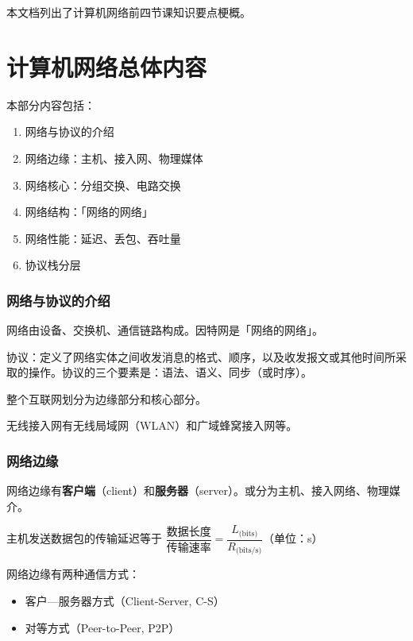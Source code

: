 \documentclass[UTF8]{ctexart}
\newcommand\Emph[1]{\colorbox{green!10}{\textcolor{green!30!black}{#1}}}
\begin{document}
{\color{cyan!50!black}
本文档列出了计算机网络前四节课知识要点梗概。
}

\part{计算机网络总体内容}
\begin{mybox}
本部分内容包括：
\begin{enumerate}[itemsep=0pt,parsep=0pt]
  \item 网络与协议的介绍
  \item 网络边缘：主机、接入网、物理媒体
  \item 网络核心：分组交换、电路交换
  \item 网络结构：「网络的网络」
  \item 网络性能：延迟、丢包、吞吐量
  \item 协议栈分层
\end{enumerate}
\end{mybox}

\section{网络与协议的介绍}
网络由设备、交换机、通信链路构成。因特网是「网络的网络」。

协议：定义了网络实体之间收发消息的格式、顺序，以及收发报文或其他时间所采取的操作。协议的三个要素是：\Emph{语法、语义、同步（或时序）}。

整个互联网划分为边缘部分和核心部分。

无线接入网有无线局域网（WLAN）和广域蜂窝接入网等。

\section{网络边缘}
网络边缘有\textbf{客户端}（client）和\textbf{服务器}（server）。或分为主机、接入网络、物理媒介。

主机发送数据包的传输延迟等于 $\dfrac{\text{数据长度}}{\text{传输速率}} = \dfrac{L_{\text{(bits)}}}{R_{\text{(bits/s)}}}$（单位：s）

网络边缘有两种通信方式：
\begin{itemize}[itemsep=0pt,parsep=0pt]
  \item 客户—服务器方式（Client-Server, C-S）
  \item 对等方式（Peer-to-Peer, P2P）
\end{itemize}
\end{document}
